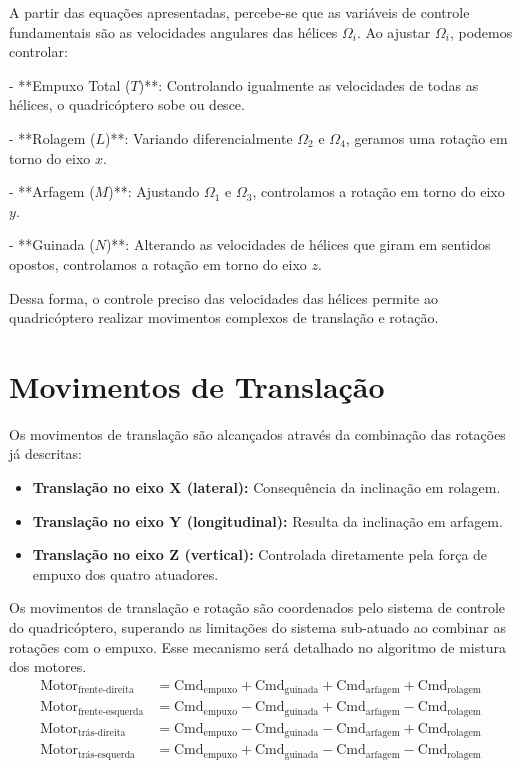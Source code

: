 A partir das equações apresentadas, percebe-se que as variáveis de controle fundamentais são as velocidades angulares das hélices \( \Omega_i \). Ao ajustar \( \Omega_i \), podemos controlar:

- **Empuxo Total (\( T \))**: Controlando igualmente as velocidades de todas as hélices, o quadricóptero sobe ou desce.

- **Rolagem (\( L \))**: Variando diferencialmente \( \Omega_2 \) e \( \Omega_4 \), geramos uma rotação em torno do eixo \( x \).

- **Arfagem (\( M \))**: Ajustando \( \Omega_1 \) e \( \Omega_3 \), controlamos a rotação em torno do eixo \( y \).

- **Guinada (\( N \))**: Alterando as velocidades de hélices que giram em sentidos opostos, controlamos a rotação em torno do eixo \( z \).

Dessa forma, o controle preciso das velocidades das hélices permite ao quadricóptero realizar movimentos complexos de translação e rotação.




\section{Movimentos de Translação}
Os movimentos de translação são alcançados através da combinação das rotações já descritas:

\begin{itemize}
	\item \textbf{Translação no eixo X (lateral):} Consequência da inclinação em rolagem.
	\item \textbf{Translação no eixo Y (longitudinal):} Resulta da inclinação em arfagem.
	\item \textbf{Translação no eixo Z (vertical):} Controlada diretamente pela força de empuxo dos quatro atuadores.
\end{itemize}

Os movimentos de translação e rotação são coordenados pelo sistema de controle do quadricóptero, superando as limitações do sistema sub-atuado ao combinar as rotações com o empuxo. Esse mecanismo será detalhado no algoritmo de mistura dos motores.
\begin{align}
	\text{Motor}_{\text{frente-direita}} &= \text{Cmd}_{\text{empuxo}} + \text{Cmd}_{\text{guinada}} + \text{Cmd}_{\text{arfagem}} + \text{Cmd}_{\text{rolagem}} \\
	\text{Motor}_{\text{frente-esquerda}} &= \text{Cmd}_{\text{empuxo}} - \text{Cmd}_{\text{guinada}} + \text{Cmd}_{\text{arfagem}} - \text{Cmd}_{\text{rolagem}} \\
	\text{Motor}_{\text{trás-direita}} &= \text{Cmd}_{\text{empuxo}} - \text{Cmd}_{\text{guinada}} - \text{Cmd}_{\text{arfagem}} + \text{Cmd}_{\text{rolagem}} \\
	\text{Motor}_{\text{trás-esquerda}} &= \text{Cmd}_{\text{empuxo}} + \text{Cmd}_{\text{guinada}} - \text{Cmd}_{\text{arfagem}} - \text{Cmd}_{\text{rolagem}}
\end{align}

